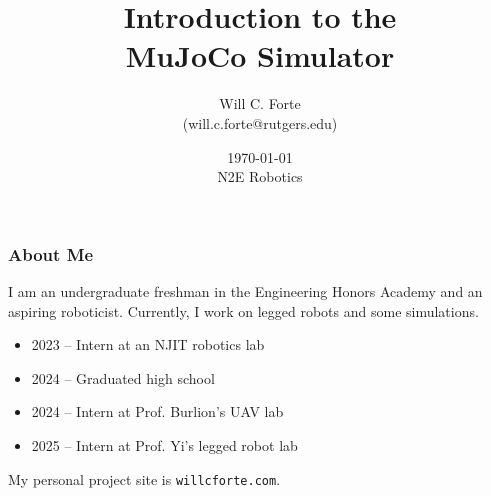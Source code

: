 \documentclass[14pt]{beamer}
\begin{document}
	\author[Will C. Forte]{Will C. Forte\\ (will.c.forte@rutgers.edu)}
	\title{Introduction to the\\ MuJoCo Simulator}
	\date[\today]{\today\\ N2E Robotics}
	\begin{frame}[plain]
		\maketitle
	\end{frame}
	
	\begin{frame}
		\frametitle{About Me}
		
		I am an undergraduate freshman in the Engineering Honors Academy and an aspiring roboticist. Currently, I work on legged robots and some simulations.
		\vspace{0.6cm}
		
		\begin{itemize}
			\item 2023 -- Intern at an NJIT robotics lab
			\item 2024 -- Graduated high school
			\item 2024 -- Intern at Prof. Burlion's UAV lab
			\item 2025 -- Intern at Prof. Yi's legged robot lab
		\end{itemize}

		\vspace{0.6cm}
		
		My personal project site is \texttt{willcforte.com}.
	\end{frame}
	
\end{document}
